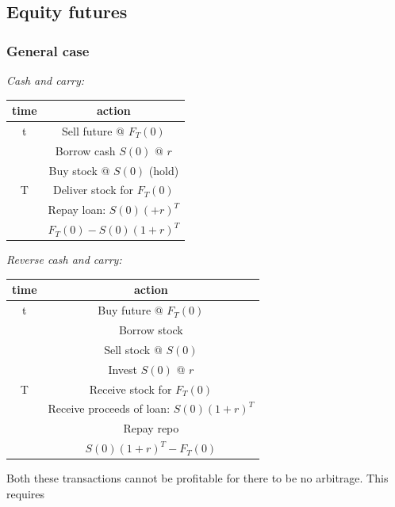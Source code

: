 \subsection{Equity futures}


\subsubsection{General case}

\textit{Cash and carry:}

\begin{center} \begin{tabular}{|c|c|}
  \hline
  time & action \\
  \hline
  t & Sell future @ $F_{T}(0)$  \\
    & Borrow cash $S(0)$ @ $r$ \\
    & Buy stock @ $S(0)$ (hold) \\
  \hline
 T & Deliver stock for $F_T(0)$ \\
   & Repay loan: $S(0)(+r)^T$ \\
  \hline
   & $F_{T}(0) - S(0)(1+r)^{T}$\\
  \hline
\end{tabular}\end{center}

\textit{Reverse cash and carry:}

\begin{center} \begin{tabular}{|c|c|}
  \hline
  time & action \\
  \hline
  t & Buy future @ $F_{T}(0)$  \\
    & Borrow stock \\
    & Sell stock @ $S(0)$  \\
    & Invest $S(0)$ @ $r$\\
  \hline
  T & Receive stock for $F_T(0)$ \\
    & Receive proceeds of loan: $S(0)(1+r)^T$\\
    & Repay repo \\
  \hline
   & $S(0)(1+r)^{T}-F_{T}(0)$\\
  \hline
\end{tabular}\end{center}

Both these transactions cannot be profitable for there to be no arbitrage. This requires

